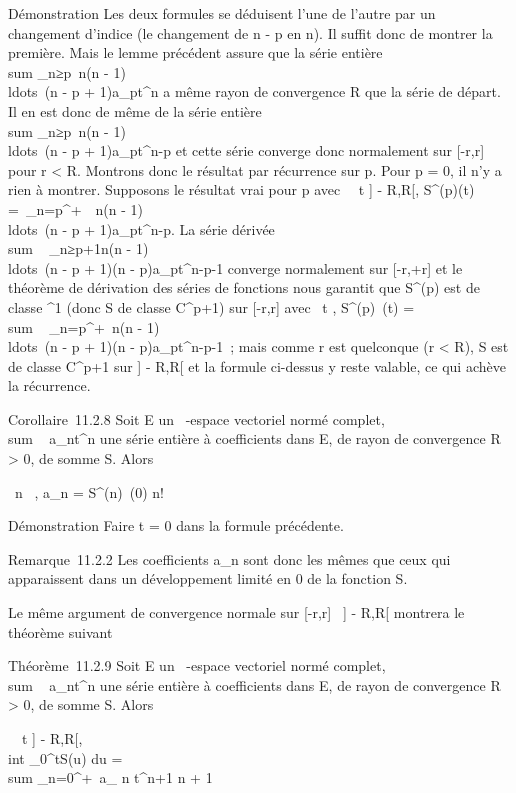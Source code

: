 \documentclass[]{article}
\begin{document}
Démonstration Les deux formules se déduisent l'une de l'autre par un
changement d'indice (le changement de n - p en n). Il suffit donc de
montrer la première. Mais le lemme précédent assure que la série entière
\\sum  _n≥p~n(n
- 1)\\ldots~(n - p +
1)a_pt^n a même rayon de convergence R que la série
de départ. Il en est donc de même de la série entière
\\sum  _n≥p~n(n
- 1)\\ldots~(n - p +
1)a_pt^n-p et cette série converge donc normalement
sur [-r,r] pour r < R. Montrons donc le résultat par
récurrence sur p. Pour p = 0, il n'y a rien à montrer. Supposons le
résultat vrai pour p avec \forall~~t \in] - R,R[,
S^(p)(t) =\
\sum  _n=p^+\infty~~n(n -
1)\\ldots~(n - p +
1)a_pt^n-p. La série dérivée
\\sum ~
_n≥p+1n(n -
1)\\ldots~(n - p +
1)(n - p)a_pt^n-p-1 converge normalement sur
[-r,+r] et le théorème de dérivation des séries de fonctions nous
garantit que S^(p) est de classe \mathcal{C}^1 (donc S de
classe C^p+1) sur [-r,r] avec
\forall~t \in [-r,r], S^(p)~(t)
= \\sum ~
_n=p^+\infty~n(n -
1)\\ldots~(n - p +
1)(n - p)a_pt^n-p-1~; mais comme r est quelconque (r
< R), S est de classe C^p+1 sur ] - R,R[ et la
formule ci-dessus y reste valable, ce qui achève la récurrence.

Corollaire~11.2.8 Soit E un ~-espace vectoriel normé complet,
\\sum ~
a_nt^n une série entière à coefficients dans E, de
rayon de convergence R > 0, de somme S. Alors

\forall~n \in {}~, a_n = S^(n)~(0)
\over n!

Démonstration Faire t = 0 dans la formule précédente.

Remarque~11.2.2 Les coefficients a_n sont donc les mêmes que
ceux qui apparaissent dans un développement limité en 0 de la fonction
S.

Le même argument de convergence normale sur [-r,r] \subset~] - R,R[
montrera le théorème suivant

Théorème~11.2.9 Soit E un ~-espace vectoriel normé complet,
\\sum ~
a_nt^n une série entière à coefficients dans E, de
rayon de convergence R > 0, de somme S. Alors

\forall~~t \in] - R,R[, \\int
 _0^tS(u) du = \\sum
_n=0^+\infty~a_ n t^n+1
\over n + 1
\end{document}
